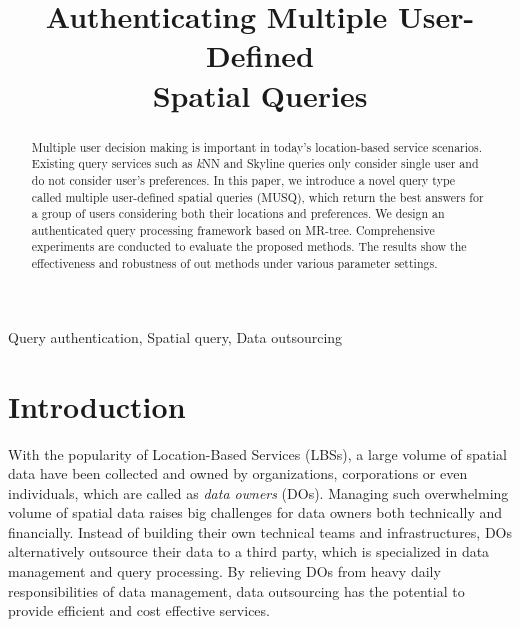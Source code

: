 \documentclass[10pt, conference, compsocconf]{IEEEtran}
\begin{document}
\title{Authenticating Multiple User-Defined \\ Spatial Queries}


\maketitle

\begin{abstract}
Multiple user decision making is important in today's location-based service scenarios. Existing query services such as \textit{k}NN and Skyline queries only consider single user and do not consider user's preferences. 
In this paper, we introduce a novel query type called multiple user-defined spatial queries (MUSQ), which return the best answers for a group of users considering both their locations and preferences. We design an authenticated query processing framework based on MR-tree. Comprehensive experiments are conducted to evaluate the proposed methods. The results show the effectiveness and robustness of out methods under various parameter settings.
\end{abstract}

\begin{IEEEkeywords}
Query authentication, Spatial query, Data outsourcing	
\end{IEEEkeywords}
\IEEEpeerreviewmaketitle


\section{Introduction}\label{intro}

With the popularity of Location-Based Services (LBSs), a large volume of spatial data have been collected and owned by organizations, corporations or even individuals, which are called as \emph{data owners} (DOs). Managing such overwhelming volume of spatial data raises big challenges for data owners both technically and financially. Instead of building their own technical teams and infrastructures, DOs alternatively outsource their data to a third party, which is specialized in data management and query processing. By relieving DOs from heavy daily responsibilities of data management, data outsourcing has the potential to provide efficient and cost effective services.
\end{document}
